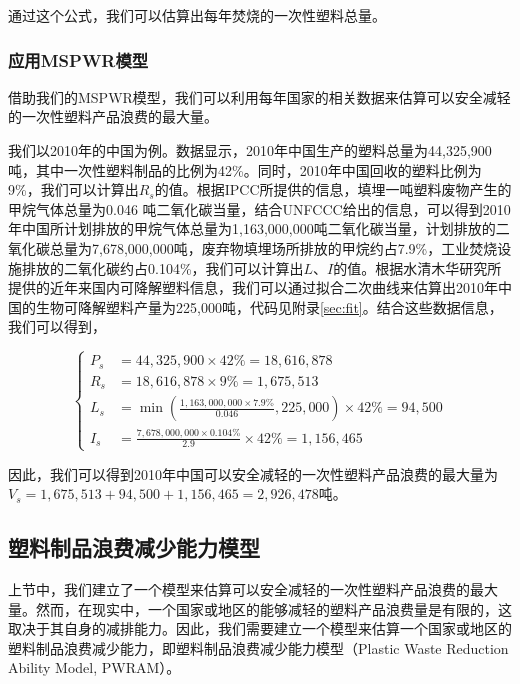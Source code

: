 \documentclass[UTF8, fontset=windows]{mcmthesis}
\begin{document}
通过这个公式，我们可以估算出每年焚烧的一次性塑料总量。

\subsubsection{应用MSPWR模型}

借助我们的MSPWR模型，我们可以利用每年国家的相关数据来估算可以安全减轻的一次性塑料产品浪费的最大量。

我们以2010年的中国为例。数据显示\cite{owid-plastic-pollution}，2010年中国生产的塑料总量为44,325,900吨，其中一次性塑料制品的比例为42\%。同时，2010年中国回收的塑料比例为9\%，我们可以计算出$R_s$的值。根据IPCC所提供的信息\cite{ipccworkinggroupii2022climate}，填埋一吨塑料废物产生的甲烷气体总量为0.046 吨二氧化碳当量，结合UNFCCC给出的信息\cite{china_third_national_communication}，可以得到2010年中国所计划排放的甲烷气体总量为1,163,000,000吨二氧化碳当量，计划排放的二氧化碳总量为7,678,000,000吨，废弃物填埋场所排放的甲烷约占7.9\%，工业焚烧设施排放的二氧化碳约占0.104\%，我们可以计算出$L$、$I$的值。根据水清木华研究所提供的近年来国内可降解塑料信息\cite{biodegradable2010}，我们可以通过拟合二次曲线来估算出2010年中国的生物可降解塑料产量为225,000吨，代码见附录\ref{sec:fit}。结合这些数据信息，我们可以得到，

\begin{equation}
\left\{
\begin{aligned}
P_s &= 44,325,900 \times 42\% = 18,616,878\\
R_s &= 18,616,878 \times 9\% = 1,675,513\\
L_s &= \min(\frac{1,163,000,000 \times 7.9\%}{0.046}, 225,000) \times 42\% = 94,500\\
I_s &= \frac{7,678,000,000 \times 0.104\%}{2.9} \times 42\% = 1,156,465
\end{aligned}
\right.
\end{equation}

因此，我们可以得到2010年中国可以安全减轻的一次性塑料产品浪费的最大量为$V_s = 1,675,513 + 94,500 + 1,156,465 = 2,926,478$吨。

\subsection{塑料制品浪费减少能力模型}

上节中，我们建立了一个模型来估算可以安全减轻的一次性塑料产品浪费的最大量。然而，在现实中，一个国家或地区的能够减轻的塑料产品浪费量是有限的，这取决于其自身的减排能力。因此，我们需要建立一个模型来估算一个国家或地区的塑料制品浪费减少能力，即塑料制品浪费减少能力模型（Plastic Waste Reduction Ability Model, PWRAM）。
\end{document}
